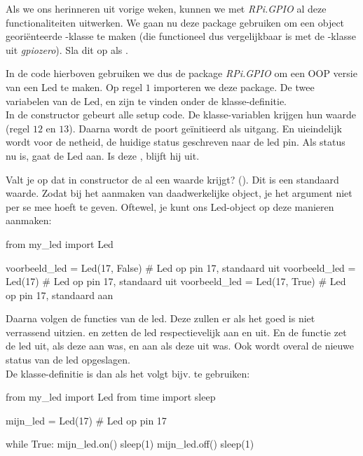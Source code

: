 Als we ons herinneren uit vorige weken, kunnen we met \textit{RPi.GPIO} al deze functionaliteiten uitwerken. We gaan nu deze package gebruiken om een object georiënteerde -klasse te maken (die functioneel dus vergelijkbaar is met de -klasse uit \textit{gpiozero}). Sla dit op als .


In de code hierboven gebruiken we dus de package \textit{RPi.GPIO} om een OOP versie van een Led te maken. Op regel $1$ importeren we deze package. De twee variabelen van de Led,  en  zijn te vinden onder de klasse-definitie. \\
In de constructor gebeurt alle setup code. De klasse-variablen krijgen hun waarde (regel $12$ en $13$). Daarna wordt de poort geïnitieerd als uitgang. En uieindelijk wordt voor de netheid, de huidige status geschreven naar de led pin. Als status nu  is, gaat de Led aan. Is deze , blijft hij uit.
\begin{remark}
Valt je op dat in constructor de  al een waarde krijgt? (). Dit is een standaard waarde. Zodat bij het aanmaken van daadwerkelijke object, je het argument  niet per se mee hoeft te geven. Oftewel, je kunt ons Led-object op deze manieren aanmaken:
\begin{python}
from my_led import Led

voorbeeld_led = Led(17, False)  # Led op pin 17, standaard uit  
voorbeeld_led = Led(17)         # Led op pin 17, standaard uit  
voorbeeld_led = Led(17, True)   # Led op pin 17, standaard aan  
\end{python}
\end{remark}
Daarna volgen de functies van de led. Deze zullen er als het goed is niet verrassend uitzien.  en  zetten de led respectievelijk aan en uit. En de  functie zet de led uit, als deze aan was, en aan als deze uit was. Ook wordt overal de nieuwe status van de led opgeslagen. \\

De klasse-definitie is dan als het volgt bijv. te gebruiken:
\begin{python}
from my_led import Led
from time import sleep

mijn_led = Led(17)  # Led op pin 17

while True:
  mijn_led.on()
  sleep(1)
  mijn_led.off()
  sleep(1)
\end{python}

